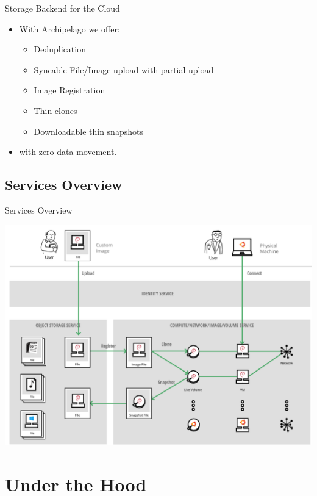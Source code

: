 \documentclass[utf8]{beamer}
\begin{document}
\begin{frame}{Storage Backend for the Cloud}

  \begin{itemize}
  \item With Archipelago we offer:
    \begin{itemize}
      \item Deduplication
      \item Syncable File/Image upload with partial upload
      \item Image Registration
      \item Thin clones
      \item Downloadable thin snapshots
    \end{itemize}
  \item with zero data movement.
  \end{itemize}
  
\end{frame}

\subsection{Services Overview}

\begin{frame}{Services Overview}

  \begin{center}
    \includegraphics[width=.85\linewidth]{figures/services.png}
  \end{center}
  
\end{frame}

\section{Under the Hood}
\end{document}
